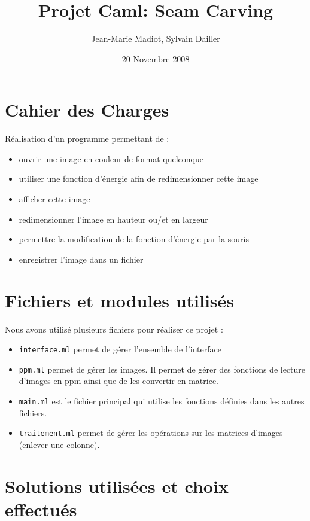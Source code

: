 \documentclass[a4paper]{article}
\title{Projet Caml: Seam Carving}
\author{Jean-Marie Madiot, Sylvain Dailler}
\date{20 Novembre 2008}
\begin{document}
\maketitle{}

\section{Cahier des Charges}

Réalisation d'un programme permettant de :
\begin{itemize}
\item{ouvrir une image en couleur de format quelconque}
\item{utiliser une fonction d'énergie afin de redimensionner cette image}
\item{afficher cette image}
\item{redimensionner l'image en hauteur ou/et en largeur}
\item{permettre la modification de la fonction d'énergie par la souris}
\item{enregistrer l'image dans un fichier}

\end{itemize}

\section{Fichiers et modules utilisés}

Nous avons utilisé plusieurs fichiers pour réaliser ce projet : 
\begin{itemize}
\item{{\tt interface.ml} permet de gérer l'ensemble de l'interface} 
\item{{\tt ppm.ml} permet de gérer les images. Il permet de gérer des fonctions de lecture d'images en ppm ainsi que de les  convertir en matrice.}
\item{{\tt main.ml} est le fichier principal qui utilise les fonctions définies dans les autres fichiers.}
\item{{\tt traitement.ml} permet de gérer les opérations sur les matrices d'images (enlever une colonne).} 
\end{itemize}

\section{Solutions utilisées et choix effectués}
\end{document}
